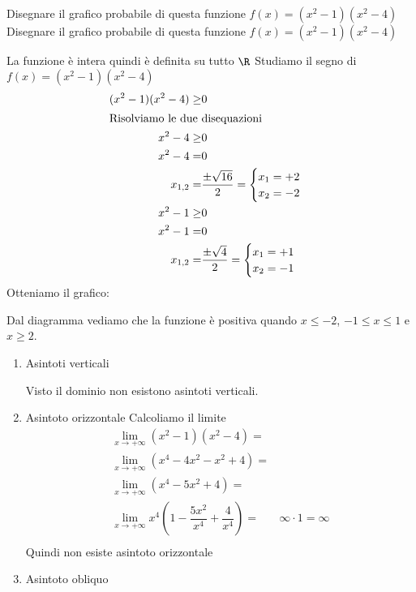 \begin{exercise}
	Disegnare il grafico probabile di questa funzione $f(x)=(x^2-1)(x^2-4)$
	\tcblower
	Disegnare il grafico probabile di questa funzione $f(x)=(x^2-1)(x^2-4)$

			\begin{itemize}
			La funzione è intera quindi è definita su tutto $\R$
			Studiamo il segno di $f(x)=(x^2-1)(x^2-4)$
			\begin{align*}
			(x^2-1)(x^2-4)\geq&0\\
			\intertext{Risolviamo le due disequazioni}
			x^2-4\geq&0\\
			x^2-4=&0\\
				x_{1,2}=&\dfrac{\pm\sqrt{16}}{2}
			=\begin{cases}
			x_1=+2\\
			x_2=-2
			\end{cases}\\
			x^2-1\geq&0\\
			x^2-1=&0\\
			x_{1,2}=&\dfrac{\pm\sqrt{4}}{2}
			=\begin{cases}
			x_1=+1\\
			x_2=-1
			\end{cases}
			\end{align*}
			Otteniamo il grafico:
			\begin{center}
				
			\end{center}
			Dal diagramma vediamo che la funzione è positiva quando $x\leq -2$, $-1\leq x \leq 1$ e $x\geq 2$.
			\begin{enumerate}
				\item Asintoti verticali
				
				Visto il dominio non esistono asintoti verticali.
				\item Asintoto orizzontale 
				Calcoliamo il limite
				\begin{align*}
				\lim_{x\to +\infty}(x^2-1)(x^2-4)=&\\
				\lim_{x\to +\infty}(x^4-4x^2-x^2+4)=&\\
				\lim_{x\to +\infty}(x^4-5x^2+4)=&\\
				\lim_{x\to +\infty}x^4(1-\dfrac{5x^2}{x^4}+\dfrac{4}{x^4})=&\infty\cdot 1=\infty\\
				\end{align*}
				Quindi non esiste asintoto orizzontale
				\item Asintoto obliquo
				

\end{enumerate}
\end{itemize}
\end{exercise}
